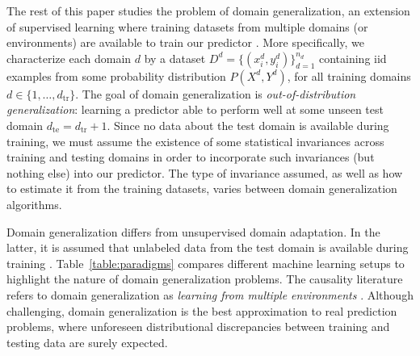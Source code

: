 \documentclass{article}
\newcommand{\dtr}{{d_\mathrm{tr}}}
\newcommand{\dte}{{d_\mathrm{te}}}
\begin{document}
The rest of this paper studies the problem of domain generalization, an extension of supervised learning where training datasets from multiple domains (or environments) are available to train our predictor \citep{blanchard2011generalizing}. 
%
More specifically, we characterize each domain $d$ by a dataset $D^d = \{(x_i^d, y_i^d)\}_{d=1}^{n_d}$ containing iid examples from some probability distribution $P(X^d, Y^d)$, for all training domains $d \in \{1, \ldots, \dtr\}$.
%
The goal of domain generalization is \emph{out-of-distribution generalization}: learning a predictor able to perform well at some unseen test domain $\dte = \dtr + 1$.
%
Since no data about the test domain is available during training, we must assume the existence of some statistical invariances across training and testing domains in order to incorporate such invariances (but nothing else) into our predictor.
%
The type of invariance assumed, as well as how to estimate it from the training datasets, varies between domain generalization algorithms.

Domain generalization differs from unsupervised domain adaptation. In the latter, it is assumed that unlabeled data from the test domain is available during training \citep{pan2009survey, patel2015visual, wilson2018survey}.
%
Table~\ref{table:paradigms} compares different machine learning setups to highlight the nature of domain generalization problems.
%
The causality literature refers to domain generalization as \emph{learning from multiple environments} \citep{peters2016causal, arjovsky2019invariant}.
%
Although challenging, domain generalization is the best approximation to real prediction problems, where unforeseen distributional discrepancies between training and testing data are surely expected.
\end{document}
